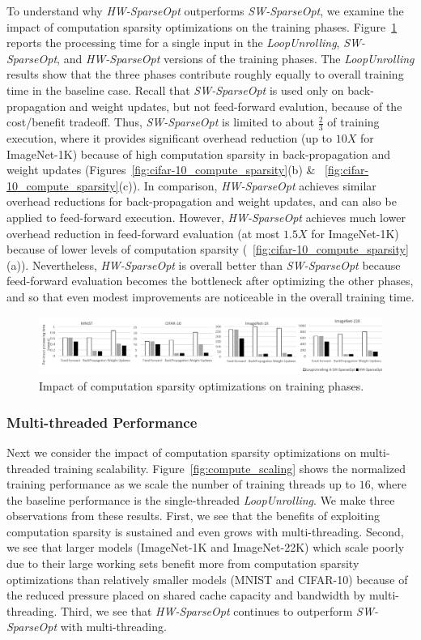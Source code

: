 To understand why {\it HW-SparseOpt} outperforms {\it SW-SparseOpt}, we examine the impact of computation sparsity optimizations on the training phases.  Figure~\ref{fig:training_breakdown} reports the processing time for a single input in the {\it LoopUnrolling}, {\it SW-SparseOpt}, and {\it HW-SparseOpt} versions of the training phases.  The {\it LoopUnrolling} results show that the three phases contribute roughly equally to overall training time in the baseline case.  Recall that {\it SW-SparseOpt} is used only on back-propagation and weight updates, but not feed-forward evalution, because of the cost/benefit tradeoff.   Thus, {\it SW-SparseOpt} is limited to about \(\frac{2}{3}\) of training execution, where it provides significant overhead reduction (up to $10X$ for ImageNet-1K) because of high computation sparsity in back-propagation and weight updates (Figures~\ref{fig:cifar-10_compute_sparsity}(b) \& ~\ref{fig:cifar-10_compute_sparsity}(c)).   In comparison, {\it HW-SparseOpt} achieves similar overhead reductions for back-propagation and weight updates, and can also be applied to feed-forward execution.  However,  {\it HW-SparseOpt}  achieves much lower overhead reduction in feed-forward evaluation  (at most $1.5X$ for ImageNet-1K) because of lower levels of computation sparsity (~\ref{fig:cifar-10_compute_sparsity}(a)).  Nevertheless, {\it HW-SparseOpt} is overall better than {\it SW-SparseOpt} because feed-forward evaluation becomes the bottleneck after optimizing the other phases, and so that even modest improvements are noticeable in the overall training time.

 \begin{figure}
 \centering
 \includegraphics[height=0.75in, width=1.95\columnwidth]{Figures/training_time_breakdown.png}
\caption{Impact of computation sparsity optimizations on training phases.}
 \label{fig:training_breakdown}
 \end{figure}


\subsubsection{Multi-threaded Performance}
Next we consider the impact of computation sparsity optimizations on multi-threaded training scalability.  Figure~\ref{fig:compute_scaling} shows the normalized training performance as we scale the number of training threads up to $16$, where the baseline performance is the single-threaded {\it LoopUnrolling}.   We make three observations from these results.  First, we see that the benefits of exploiting computation sparsity is sustained and even grows with multi-threading.  Second, we see that larger models (ImageNet-1K and ImageNet-22K) which scale poorly due to their large working sets benefit more from computation sparsity optimizations than relatively smaller models (MNIST and CIFAR-10) because of the reduced pressure placed on shared cache capacity and bandwidth by multi-threading.  Third, we see that {\it HW-SparseOpt} continues to outperform {\it SW-SparseOpt} with multi-threading. 

